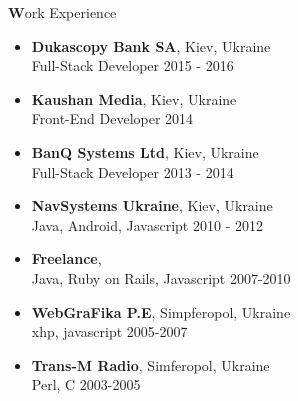 \documentclass[a4paper,12pt]{article}
\begin{document}
{%
%


{\large \textbf{W}ork Experience}

\begin{itemize}[itemsep=-2pt]

  \item \textbf{Dukascopy Bank SA}, Kiev, Ukraine\\
    Full-Stack Developer \hfill  2015 - 2016

  \item \textbf{Kaushan Media}, Kiev, Ukraine \\
    Front-End Developer \hfill  2014

  \item \textbf{BanQ Systems Ltd}, Kiev, Ukraine\\
    Full-Stack Developer \hfill  2013 - 2014

  \item \textbf{NavSystems Ukraine}, Kiev, Ukraine\\
    Java, Android, Javascript \hfill  2010 - 2012

  \item \textbf{Freelance},\\
    Java, Ruby on Rails, Javascript \hfill 2007-2010

  \item \textbf{WebGraFika P.E}, Simpferopol, Ukraine \\
    xhp, javascript \hfill 2005-2007

  \item \textbf{Trans-M Radio\texttrademark}, Simferopol, Ukraine \\
    Perl, C \hfill 2003-2005

\end{itemize}


%
%

}
\end{document}
